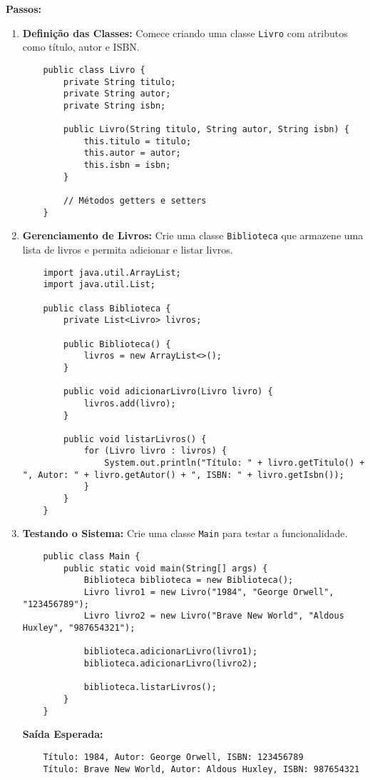 \documentclass[a4paper,12pt]{book}
\begin{document}
\textbf{Passos:}
\begin{enumerate}
    \item \textbf{Definição das Classes:} Comece criando uma classe \texttt{Livro} com atributos como título, autor e ISBN.
    
    \begin{verbatim}
    public class Livro {
        private String titulo;
        private String autor;
        private String isbn;
    
        public Livro(String titulo, String autor, String isbn) {
            this.titulo = titulo;
            this.autor = autor;
            this.isbn = isbn;
        }
    
        // Métodos getters e setters
    }
    \end{verbatim}
    
    \item \textbf{Gerenciamento de Livros:} Crie uma classe \texttt{Biblioteca} que armazene uma lista de livros e permita adicionar e listar livros.
    
    \begin{verbatim}
    import java.util.ArrayList;
    import java.util.List;
    
    public class Biblioteca {
        private List<Livro> livros;
    
        public Biblioteca() {
            livros = new ArrayList<>();
        }
    
        public void adicionarLivro(Livro livro) {
            livros.add(livro);
        }
    
        public void listarLivros() {
            for (Livro livro : livros) {
                System.out.println("Título: " + livro.getTitulo() + ", Autor: " + livro.getAutor() + ", ISBN: " + livro.getIsbn());
            }
        }
    }
    \end{verbatim}
    
    \item \textbf{Testando o Sistema:} Crie uma classe \texttt{Main} para testar a funcionalidade.
    
    \begin{verbatim}
    public class Main {
        public static void main(String[] args) {
            Biblioteca biblioteca = new Biblioteca();
            Livro livro1 = new Livro("1984", "George Orwell", "123456789");
            Livro livro2 = new Livro("Brave New World", "Aldous Huxley", "987654321");
    
            biblioteca.adicionarLivro(livro1);
            biblioteca.adicionarLivro(livro2);
    
            biblioteca.listarLivros();
        }
    }
    \end{verbatim}
    
    \textbf{Saída Esperada:}
    \begin{verbatim}
    Título: 1984, Autor: George Orwell, ISBN: 123456789
    Título: Brave New World, Autor: Aldous Huxley, ISBN: 987654321
    \end{verbatim}
\end{enumerate}
\end{document}
